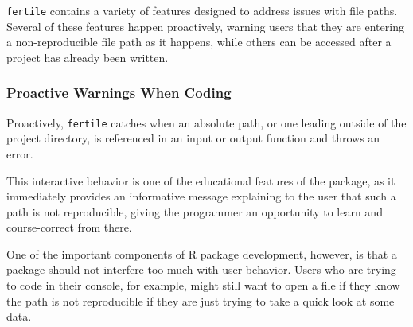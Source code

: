 \documentclass[12pt,twoside]{reedthesis}
\begin{document}
\texttt{fertile} contains a variety of features designed to address issues with file paths. Several of these features happen proactively, warning users that they are entering a non-reproducible file path as it happens, while others can be accessed after a project has already been written.

\hypertarget{proactive-warnings-when-coding}{%
\subsubsection{Proactive Warnings When Coding}\label{proactive-warnings-when-coding}}

Proactively, \texttt{fertile} catches when an absolute path, or one leading outside of the project directory, is referenced in an input or output function and throws an error.

This interactive behavior is one of the educational features of the package, as it immediately provides an informative message explaining to the user that such a path is not reproducible, giving the programmer an opportunity to learn and course-correct from there.

One of the important components of R package development, however, is that a package should not interfere too much with user behavior. Users who are trying to code in their console, for example, might still want to open a file if they know the path is not reproducible if they are just trying to take a quick look at some data.
\end{document}
